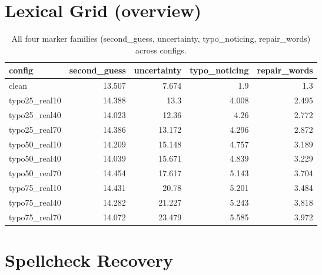 \documentclass[11pt]{article}
\begin{document}
\section*{Lexical Grid (overview)}
\begin{table}[H]
\centering
\caption{All four marker families (second\_guess, uncertainty, typo\_noticing, repair\_words) across configs.}
\small
\begin{adjustbox}{max width=\textwidth}
\begin{tabular}{lrrrr}
\toprule
\textbf{config} & \textbf{second\_guess} & \textbf{uncertainty} & \textbf{typo\_noticing} & \textbf{repair\_words} \\
\midrule
clean & 13.507 & 7.674 & 1.9 & 1.3 \\
typo25\_real10 & 14.388 & 13.3 & 4.008 & 2.495 \\
typo25\_real40 & 14.023 & 12.36 & 4.26 & 2.772 \\
typo25\_real70 & 14.386 & 13.172 & 4.296 & 2.872 \\
typo50\_real10 & 14.209 & 15.148 & 4.757 & 3.189 \\
typo50\_real40 & 14.039 & 15.671 & 4.839 & 3.229 \\
typo50\_real70 & 14.454 & 17.617 & 5.143 & 3.704 \\
typo75\_real10 & 14.431 & 20.78 & 5.201 & 3.484 \\
typo75\_real40 & 14.282 & 21.227 & 5.243 & 3.818 \\
typo75\_real70 & 14.072 & 23.479 & 5.585 & 3.972 \\
\bottomrule
\end{tabular}
\end{adjustbox}
\end{table}

\section*{Spellcheck Recovery}

\end{document}
